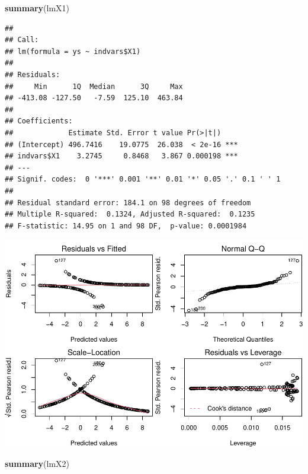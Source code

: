\documentclass[
]{book}
\newenvironment{Shaded}{\begin{snugshade}}{\end{snugshade}}
\newcommand{\KeywordTok}[1]{\textcolor[rgb]{0.13,0.29,0.53}{\textbf{#1}}}
\newcommand{\NormalTok}[1]{#1}
\newcommand{\OperatorTok}[1]{\textcolor[rgb]{0.81,0.36,0.00}{\textbf{#1}}}
\newcommand{\StringTok}[1]{\textcolor[rgb]{0.31,0.60,0.02}{#1}}
\begin{document}
\begin{Shaded}
\begin{Highlighting}[]
\KeywordTok{summary}\NormalTok{(lmX1)}
\end{Highlighting}
\end{Shaded}

\begin{verbatim}
## 
## Call:
## lm(formula = ys ~ indvars$X1)
## 
## Residuals:
##     Min      1Q  Median      3Q     Max 
## -413.08 -127.50   -7.59  125.10  463.84 
## 
## Coefficients:
##             Estimate Std. Error t value Pr(>|t|)    
## (Intercept) 496.7416    19.0775  26.038  < 2e-16 ***
## indvars$X1    3.2745     0.8468   3.867 0.000198 ***
## ---
## Signif. codes:  0 '***' 0.001 '**' 0.01 '*' 0.05 '.' 0.1 ' ' 1
## 
## Residual standard error: 184.1 on 98 degrees of freedom
## Multiple R-squared:  0.1324,	Adjusted R-squared:  0.1235 
## F-statistic: 14.95 on 1 and 98 DF,  p-value: 0.0001984
\end{verbatim}

\begin{Shaded}
\end{Shaded}

\includegraphics{ECOMODbook_files/figure-latex/unnamed-chunk-14-2.pdf}

\begin{Shaded}
\begin{Highlighting}[]
\KeywordTok{summary}\NormalTok{(lmX2)}
\end{Highlighting}
\end{Shaded}
\end{document}
